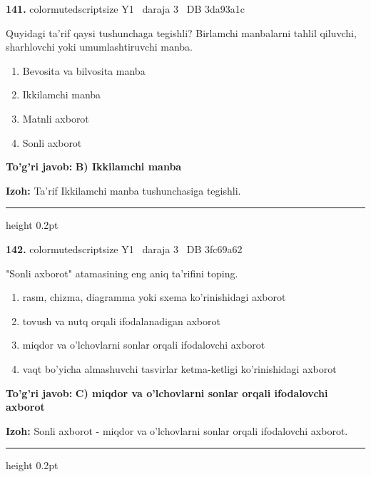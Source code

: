 \documentclass[10pt,a4paper,oneside]{article}
\begin{document}
\noindent\textbf{\color{ink}141.}  {color{muted}scriptsize Y1 \textbullet\ daraja 3 \textbullet\ DB 3da93a1c}
\par
Quyidagi ta'rif qaysi tushunchaga tegishli? Birlamchi manbalarni tahlil qiluvchi, sharhlovchi yoki umumlashtiruvchi manba.
\begin{enumerate}[label=\Alph*),leftmargin=9mm]
\item Bevosita va bilvosita manba
\item Ikkilamchi manba
\item Matnli axborot
\item Sonli axborot
\end{enumerate}
\begin{tcolorbox}[enhanced,breakable,colback=teal!4,colframe=teal!50!black,boxrule=0.5pt,arc=1.1mm,left=3mm,right=3mm,top=1.7mm,bottom=1.7mm,before skip=2mm,after skip=2mm]
\textbf{\color{teal}To'g'ri javob:} \textbf{B) Ikkilamchi manba}
\par\smallskip
\textbf{Izoh:} Ta'rif Ikkilamchi manba tushunchasiga tegishli.
\end{tcolorbox}
\vspace{2mm}\hrule height 0.2pt \vspace{3mm}

\noindent\textbf{\color{ink}142.}  {color{muted}scriptsize Y1 \textbullet\ daraja 3 \textbullet\ DB 3fc69a62}
\par
"Sonli axborot" atamasining eng aniq ta'rifini toping.
\begin{enumerate}[label=\Alph*),leftmargin=9mm]
\item rasm, chizma, diagramma yoki sxema ko'rinishidagi axborot
\item tovush va nutq orqali ifodalanadigan axborot
\item miqdor va o'lchovlarni sonlar orqali ifodalovchi axborot
\item vaqt bo'yicha almashuvchi tasvirlar ketma-ketligi ko'rinishidagi axborot
\end{enumerate}
\begin{tcolorbox}[enhanced,breakable,colback=teal!4,colframe=teal!50!black,boxrule=0.5pt,arc=1.1mm,left=3mm,right=3mm,top=1.7mm,bottom=1.7mm,before skip=2mm,after skip=2mm]
\textbf{\color{teal}To'g'ri javob:} \textbf{C) miqdor va o'lchovlarni sonlar orqali ifodalovchi axborot}
\par\smallskip
\textbf{Izoh:} Sonli axborot - miqdor va o'lchovlarni sonlar orqali ifodalovchi axborot.
\end{tcolorbox}
\vspace{2mm}\hrule height 0.2pt \vspace{3mm}
\end{document}
